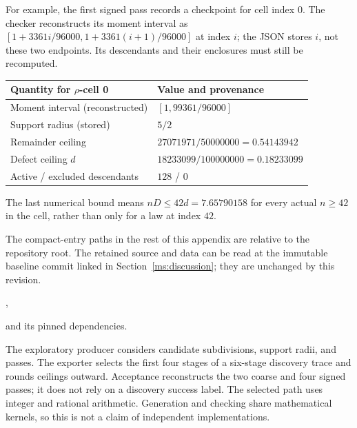 For example, the first signed pass records a checkpoint for cell index $0$.
The checker reconstructs its moment interval as
$[1+3361i/96000,1+3361(i+1)/96000]$ at index $i$; the JSON stores
$i$, not these two endpoints. Its descendants and their enclosures
must still be recomputed.
\begin{center}\small
\begin{tabular}{@{}ll@{}}
\toprule
Quantity for $\rho$-cell 0 & Value and provenance \\
\midrule
Moment interval (reconstructed) & $[1,99361/96000]$ \\
Support radius (stored) & $5/2$ \\
Remainder ceiling & $27071971/50000000=0.54143942$ \\
Defect ceiling $d$ & $18233099/100000000=0.18233099$ \\
Active / excluded descendants & $128$ / $0$ \\
\bottomrule
\end{tabular}
\end{center}
The last numerical bound means $nD\le42d=7.65790158$ for every
actual $n\ge42$ in the cell, rather than only for a law at index $42$.

The compact-entry paths in the rest of this appendix are relative to the repository root. The retained
source and data can be read at the immutable baseline commit linked in
Section~\ref{ms:discussion}; they are unchanged by this revision.
\begin{description}[style=nextline,leftmargin=1em]
\item[Certificate]
\item[Checker]
\item[Source-isolated replay]
\item[Selected exporter and exploratory producer]
,
\item[Two-pass ancestor]
and its pinned dependencies.
\end{description}
The exploratory producer considers candidate subdivisions, support
radii, and passes. The exporter selects the first four stages of a
six-stage discovery trace and rounds ceilings outward. Acceptance
reconstructs the two coarse and four signed passes; it does not rely
on a discovery success label. The selected path uses integer and
rational arithmetic. Generation and checking share mathematical
kernels, so this is not a claim of independent implementations.

